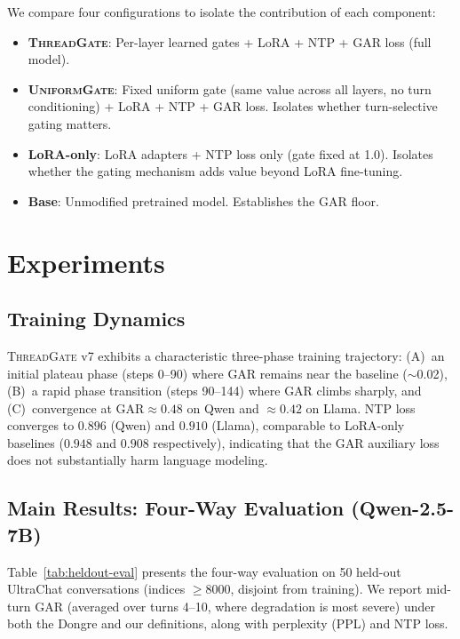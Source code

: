 \documentclass[11pt,a4paper]{article}
\newcommand{\gar}{\textsc{GAR}}
\newcommand{\tg}{\textsc{ThreadGate}}
\newcommand{\ug}{\textsc{UniformGate}}
\begin{document}
We compare four configurations to isolate the contribution of each component:
\begin{itemize}
    \item \textbf{\tg{}}: Per-layer learned gates + LoRA + NTP + \gar{} loss (full model).
    \item \textbf{\ug{}}: Fixed uniform gate (same value across all layers, no turn conditioning) + LoRA + NTP + \gar{} loss. Isolates whether turn-selective gating matters.
    \item \textbf{LoRA-only}: LoRA adapters + NTP loss only (gate fixed at 1.0). Isolates whether the gating mechanism adds value beyond LoRA fine-tuning.
    \item \textbf{Base}: Unmodified pretrained model. Establishes the \gar{} floor.
\end{itemize}

\section{Experiments}
\label{sec:experiments}

\subsection{Training Dynamics}

\tg{} v7 exhibits a characteristic three-phase training trajectory: (A)~an initial plateau phase (steps 0--90) where \gar{} remains near the baseline ($\sim$0.02), (B)~a rapid phase transition (steps 90--144) where \gar{} climbs sharply, and (C)~convergence at \gar{}$\approx 0.48$ on Qwen and $\approx 0.42$ on Llama.
NTP loss converges to $0.896$ (Qwen) and $0.910$ (Llama), comparable to LoRA-only baselines ($0.948$ and $0.908$ respectively), indicating that the \gar{} auxiliary loss does not substantially harm language modeling.

\subsection{Main Results: Four-Way Evaluation (Qwen-2.5-7B)}
\label{sec:main-results}

Table~\ref{tab:heldout-eval} presents the four-way evaluation on 50 held-out UltraChat conversations (indices $\geq$8000, disjoint from training).
We report mid-turn \gar{} (averaged over turns 4--10, where degradation is most severe) under both the Dongre and our definitions, along with perplexity (PPL) and NTP loss.
\end{document}
